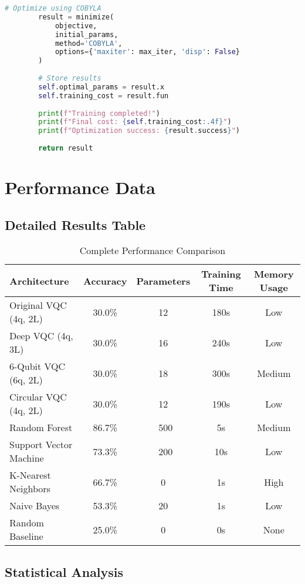 \documentclass[11pt,a4paper]{article}
\begin{document}
\begin{lstlisting}[language=Python, caption=Complete VQC Implementation]
        # Optimize using COBYLA
        result = minimize(
            objective,
            initial_params,
            method='COBYLA',
            options={'maxiter': max_iter, 'disp': False}
        )
        
        # Store results
        self.optimal_params = result.x
        self.training_cost = result.fun
        
        print(f"Training completed!")
        print(f"Final cost: {self.training_cost:.4f}")
        print(f"Optimization success: {result.success}")
        
        return result
\end{lstlisting}

\section{Performance Data}

\subsection{Detailed Results Table}

\begin{table}[h]
\centering
\caption{Complete Performance Comparison}
\begin{tabular}{|l|c|c|c|c|}
\hline
\textbf{Architecture} & \textbf{Accuracy} & \textbf{Parameters} & \textbf{Training Time} & \textbf{Memory Usage} \\
\hline
Original VQC (4q, 2L) & 30.0\% & 12 & 180s & Low \\
Deep VQC (4q, 3L) & 30.0\% & 16 & 240s & Low \\
6-Qubit VQC (6q, 2L) & 30.0\% & 18 & 300s & Medium \\
Circular VQC (4q, 2L) & 30.0\% & 12 & 190s & Low \\
\hline
Random Forest & 86.7\% & ~500 & 5s & Medium \\
Support Vector Machine & 73.3\% & ~200 & 10s & Low \\
K-Nearest Neighbors & 66.7\% & 0 & 1s & High \\
Naive Bayes & 53.3\% & 20 & 1s & Low \\
\hline
Random Baseline & 25.0\% & 0 & 0s & None \\
\hline
\end{tabular}
\end{table}

\subsection{Statistical Analysis}
\end{document}
